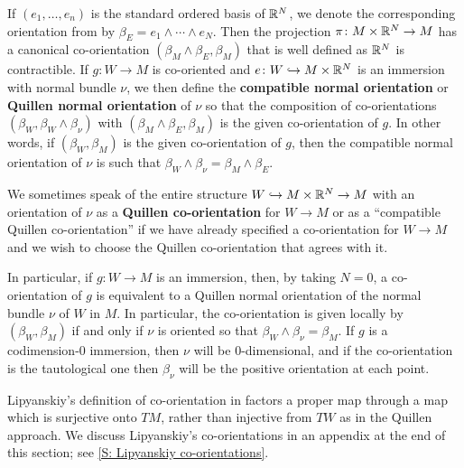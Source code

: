 \begin{definition}\label{D: Quillen normal or}
	If $(e_1, \ldots, e_n)$ is the standard ordered basis of $\mathbb{R}^N$, we denote the corresponding orientation from by $\beta_E = e_1 \wedge \cdots \wedge e_N$.
	Then the projection $\pi \colon M \times \mathbb{R}^N \to M$ has a canonical co-orientation $(\beta_M \wedge \beta_E, \beta_M)$ that is well defined as $\mathbb{R}^N$ is contractible.
	If $g \colon W \to M$ is co-oriented and $e \colon W \hookrightarrow M \times \mathbb{R}^N$ is an immersion with normal bundle $\nu$, we then define the \textbf{compatible normal orientation} or \textbf{Quillen normal orientation} of $\nu$ so that the composition of co-orientations $(\beta_W,\beta_W \wedge \beta_\nu)$ with $(\beta_M \wedge \beta_E,\beta_M)$ is the given co-orientation of $g$.
	In other words, if $(\beta_W,\beta_M)$ is the given co-orientation of $g$, then the compatible normal orientation of $\nu$ is such that $\beta_W \wedge \beta_\nu = \beta_M \wedge \beta_E$.

	We sometimes speak of the entire structure $W \hookrightarrow M \times \mathbb{R}^N \to M$ with an orientation of $\nu$ as a \textbf{Quillen co-orientation} for $W \to M$ or as a ``compatible Quillen co-orientation'' if we have already specified a co-orientation for $W \to M$ and we wish to choose the Quillen co-orientation that agrees with it.
\end{definition}

\begin{remark}\label{R: immersion}
	In particular, if $g \colon W \to M$ is an immersion, then, by taking $N = 0$, a co-orientation of $g$ is equivalent to a Quillen normal orientation of the normal bundle $\nu$ of $W$ in $M$.
	In particular, the co-orientation is given locally by $(\beta_W, \beta_M)$ if and only if $\nu$ is oriented so that $\beta_W \wedge \beta_\nu = \beta_M$.
	If $g$ is a codimension-$0$ immersion, then $\nu$ will be $0$-dimensional, and if the co-orientation is the tautological one then $\beta_\nu$ will be the positive orientation at each point.
\end{remark}

Lipyanskiy's definition of co-orientation in \cite{Lipy14} factors a proper map through a map which is surjective onto $TM$, rather than injective from $TW$ as in the Quillen approach.
We discuss Lipyanskiy's co-orientations in an appendix at the end of this section; see \cref{S: Lipyanskiy co-orientations}.

